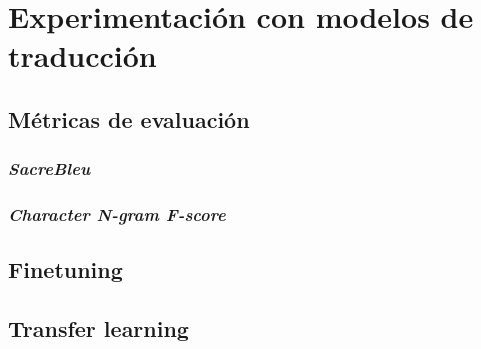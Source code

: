 \section{Experimentación con modelos de traducción}
\subsection{Métricas de evaluación}
\subsubsection{\textit{SacreBleu}}
\subsubsection{\textit{Character N-gram F-score}}
\subsection{Finetuning}
\subsection{Transfer learning}